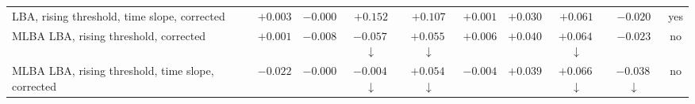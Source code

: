 \begin{table}[p]
\begin{tabular}{>{\raggedright\arraybackslash}p{3.9cm}ccccccccc}
LBA, rising threshold, time slope, corrected & $+0.003$ & $-0.000$ & $+0.152$ & $+0.107$ & $+0.001$ & $+0.030$ & $+0.061$ & $-0.020$ & yes \\
MLBA LBA, rising threshold, corrected & $+0.001$ & $-0.008$ & $-0.057$\,$\downarrow$ & $+0.055$\,$\downarrow$ & $+0.006$ & $+0.040$ & $+0.064$\,$\downarrow$ & $-0.023$ & no \\
MLBA LBA, rising threshold, time slope, corrected & $-0.022$ & $-0.000$ & $-0.004$\,$\downarrow$ & $+0.054$\,$\downarrow$ & $-0.004$ & $+0.039$ & $+0.066$\,$\downarrow$ & $-0.038$\,$\downarrow$ & no \\
\bottomrule
\end{tabular}
\end{table}
